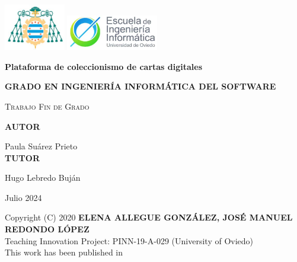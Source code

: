 \documentclass[11pt]{report} %
\begin{document}


\hypersetup{pageanchor=false}

\begin{titlepage}
	\centering
	\includegraphics[width=0.2\textwidth]{EscudoUniovi}
	\hspace{3 cm}
	\includegraphics[width=0.3\textwidth]{EscudoEscuela}
	\par\vspace{1cm}
	
	\vspace{1.5cm}
	{\huge\bfseries Plataforma de coleccionismo de cartas digitales\par}
	\vspace{2cm}
	{\large \textbf{GRADO EN INGENIERÍA INFORMÁTICA DEL SOFTWARE} \par}
	\vspace{1cm}
	{\scshape\Large Trabajo Fin de Grado\par}
   	
  \vspace{2cm}
	\textbf{AUTOR}\par
	Paula Suárez Prieto \\
	\vspace{1.5cm}
	\textbf{TUTOR}\par
	Hugo Lebredo Buján
	\vfill
	
	{\large Julio 2024 \par}
\end{titlepage}

\newpage
\pagestyle{plain}
Copyright (C) 2020 \textbf{ELENA ALLEGUE GONZÁLEZ, JOSÉ MANUEL REDONDO LÓPEZ} \\
Teaching Innovation Project: PINN-19-A-029 (University of Oviedo)\\
This work has been published in \cite{RedondoPlantillasRG19} \cite{RedondoUCO20}\\
\\

\pagestyle{fancy}
\end{document}
